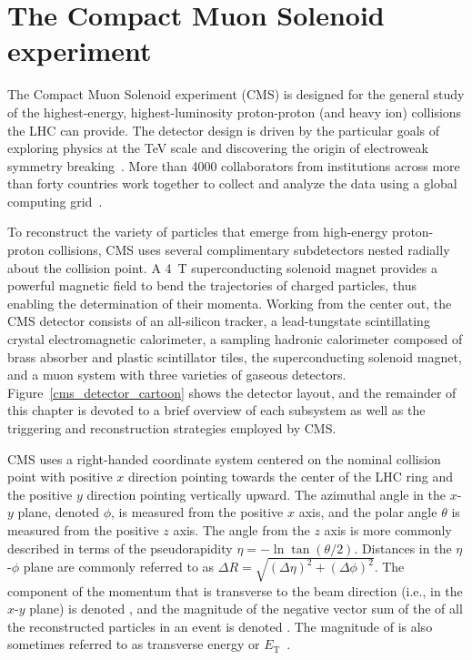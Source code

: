 \section{The Compact Muon Solenoid experiment}
\label{cms}
The Compact Muon Solenoid experiment (CMS) is designed for the general study of the highest-energy, highest-luminosity proton-proton (and heavy ion) collisions the LHC can provide. The detector design is driven by the particular goals of exploring physics at the \si{\TeV} scale and discovering the origin of electroweak symmetry breaking~\cite{cms_tdr_v2}. More than 4000 collaborators from institutions across more than forty countries work together to collect and analyze the data using a global computing grid~\cite{cms_collaboration}.

To reconstruct the variety of particles that emerge from high-energy proton-proton collisions, CMS uses several complimentary subdetectors nested radially about the collision point. A \SI{4}{\tesla} superconducting solenoid magnet provides a powerful magnetic field to bend the trajectories of charged particles, thus enabling the determination of their momenta. Working from the center out, the CMS detector consists of an all-silicon tracker, a lead-tungstate scintillating crystal electromagnetic calorimeter, a sampling hadronic calorimeter composed of brass absorber and plastic scintillator tiles, the superconducting solenoid magnet, and a muon system with three varieties of gaseous detectors. Figure~\ref{cms_detector_cartoon} shows the detector layout, and the remainder of this chapter is devoted to a brief overview of each subsystem as well as the triggering and reconstruction strategies employed by CMS.



CMS uses a right-handed coordinate system centered on the nominal collision point with positive $x$ direction pointing towards the center of the LHC ring and the positive $y$ direction pointing vertically upward. The azimuthal angle in the $x$-$y$ plane, denoted $\phi$, is measured from the positive $x$ axis, and the polar angle $\theta$ is measured from the positive $z$ axis. The angle from the $z$ axis is more commonly described in terms of the pseudorapidity $\eta=-\ln\tan(\theta/2)$. Distances in the $\eta$-$\phi$ plane are commonly referred to as $\Delta R = \sqrt{(\Delta \eta)^2 + (\Delta \phi)^2}$. The component of the momentum that is transverse to the beam direction (i.e., in the $x$-$y$ plane) is denoted \pt, and the magnitude of the negative vector sum of the \pt of all the reconstructed particles in an event is denoted \ptmiss. The magnitude of \pt is also sometimes referred to as transverse energy or $E_\mathrm{T}$~\cite{cms_tdr_v1, cms_experiment}.

